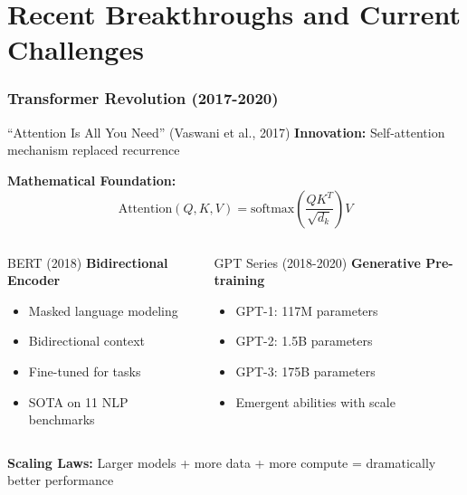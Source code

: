 \documentclass{beamer}
\begin{document}
\section{Recent Breakthroughs and Current Challenges}

\begin{frame}
    \frametitle{Transformer Revolution (2017-2020)}
    \begin{block}{``Attention Is All You Need'' (Vaswani et al., 2017)}
        \textbf{Innovation:} Self-attention mechanism replaced recurrence
        
        \textbf{Mathematical Foundation:}
        $$\text{Attention}(Q,K,V) = \text{softmax}\left(\frac{QK^T}{\sqrt{d_k}}\right)V$$
    \end{block}
    
    \begin{columns}
        \begin{column}{0.48\textwidth}
            \begin{alertblock}{BERT (2018)}
                \textbf{Bidirectional Encoder}
                \begin{itemize}
                    \item Masked language modeling
                    \item Bidirectional context
                    \item Fine-tuned for tasks
                    \item SOTA on 11 NLP benchmarks
                \end{itemize}
            \end{alertblock}
        \end{column}
        \begin{column}{0.48\textwidth}
            \begin{exampleblock}{GPT Series (2018-2020)}
                \textbf{Generative Pre-training}
                \begin{itemize}
                    \item GPT-1: 117M parameters
                    \item GPT-2: 1.5B parameters
                    \item GPT-3: 175B parameters
                    \item Emergent abilities with scale
                \end{itemize}
            \end{exampleblock}
        \end{column}
    \end{columns}
    
    \textcolor{MyBlue}{\textbf{Scaling Laws:}} Larger models + more data + more compute = dramatically better performance
\end{frame}
\end{document}
